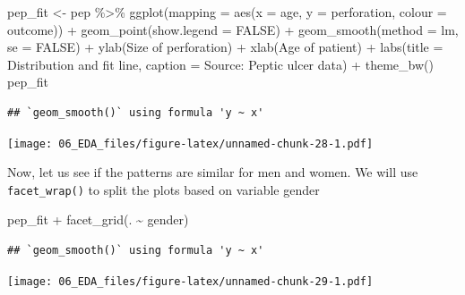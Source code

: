 \documentclass[
  10pt,
]{krantz}
\newenvironment{Shaded}{\begin{snugshade}}{\end{snugshade}}
\newcommand{\AttributeTok}[1]{\textcolor[rgb]{0.77,0.63,0.00}{#1}}
\newcommand{\ConstantTok}[1]{\textcolor[rgb]{0.00,0.00,0.00}{#1}}
\newcommand{\FunctionTok}[1]{\textcolor[rgb]{0.00,0.00,0.00}{#1}}
\newcommand{\NormalTok}[1]{#1}
\newcommand{\OtherTok}[1]{\textcolor[rgb]{0.56,0.35,0.01}{#1}}
\newcommand{\SpecialCharTok}[1]{\textcolor[rgb]{0.00,0.00,0.00}{#1}}
\newcommand{\StringTok}[1]{\textcolor[rgb]{0.31,0.60,0.02}{#1}}
\begin{document}
\begin{Shaded}
\begin{Highlighting}[]
\NormalTok{pep\_fit }\OtherTok{\textless{}{-}}\NormalTok{ pep }\SpecialCharTok{\%\textgreater{}\%} 
  \FunctionTok{ggplot}\NormalTok{(}\AttributeTok{mapping =} \FunctionTok{aes}\NormalTok{(}\AttributeTok{x =}\NormalTok{ age, }\AttributeTok{y =}\NormalTok{ perforation, }\AttributeTok{colour =}\NormalTok{ outcome)) }\SpecialCharTok{+}
  \FunctionTok{geom\_point}\NormalTok{(}\AttributeTok{show.legend =} \ConstantTok{FALSE}\NormalTok{) }\SpecialCharTok{+}
  \FunctionTok{geom\_smooth}\NormalTok{(}\AttributeTok{method =}\NormalTok{ lm, }\AttributeTok{se =} \ConstantTok{FALSE}\NormalTok{) }\SpecialCharTok{+}
  \FunctionTok{ylab}\NormalTok{(}\StringTok{\textquotesingle{}Size of perforation\textquotesingle{}}\NormalTok{) }\SpecialCharTok{+}
  \FunctionTok{xlab}\NormalTok{(}\StringTok{\textquotesingle{}Age of patient\textquotesingle{}}\NormalTok{) }\SpecialCharTok{+}
  \FunctionTok{labs}\NormalTok{(}\AttributeTok{title =} \StringTok{\textquotesingle{}Distribution and fit line\textquotesingle{}}\NormalTok{,}
       \AttributeTok{caption =} \StringTok{\textquotesingle{}Source: Peptic ulcer data\textquotesingle{}}\NormalTok{) }\SpecialCharTok{+}
  \FunctionTok{theme\_bw}\NormalTok{() }
\NormalTok{pep\_fit }
\end{Highlighting}
\end{Shaded}

\begin{verbatim}
## `geom_smooth()` using formula 'y ~ x'
\end{verbatim}

\texttt{[image: 06\_EDA\_files/figure-latex/unnamed-chunk-28-1.pdf]}

Now, let us see if the patterns are similar for men and women. We will use \texttt{facet\_wrap()} to split the plots based on variable gender

\begin{Shaded}
\begin{Highlighting}[]
\NormalTok{pep\_fit }\SpecialCharTok{+} \FunctionTok{facet\_grid}\NormalTok{(. }\SpecialCharTok{\textasciitilde{}}\NormalTok{ gender)}
\end{Highlighting}
\end{Shaded}

\begin{verbatim}
## `geom_smooth()` using formula 'y ~ x'
\end{verbatim}

\texttt{[image: 06\_EDA\_files/figure-latex/unnamed-chunk-29-1.pdf]}
\end{document}
